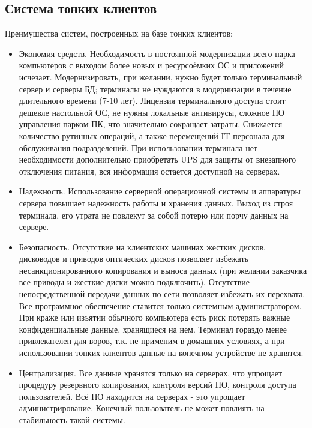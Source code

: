\subsection{Система тонких клиентов}

Преимушества систем, построенных на базе тонких клиентов:
\begin{itemize}
    \item   Экономия средств. Необходимость в постоянной модернизации всего парка
        компьютеров с выходом более новых и ресурсоёмких ОС и приложений исчезает.
        Модернизировать, при желании, нужно будет только терминальный сервер и серверы
        БД; терминалы не нуждаются в модернизации в течение длительного времени (7-10
        лет). Лицензия терминального доступа стоит дешевле настольной ОС, не нужны
        локальные антивирусы, сложное ПО управления парком ПК, что значительно сокращает
        затраты. Снижается количество рутинных операций, а также перемещений IT
        персонала для обслуживания подразделений. При использовании терминала нет
        необходимости дополнительно приобретать UPS для защиты от внезапного отключения
        питания, вся информация остается доступной на серверах.
    \item   Надежность. Использование серверной операционной системы и аппаратуры
        сервера повышает надежность работы и хранения данных. Выход из строя терминала,
        его утрата не повлекут за собой потерю или порчу данных на сервере.
    \item   Безопасность. Отсутствие на клиентских машинах жестких дисков, дисководов и
        приводов оптических дисков позволяет избежать несанкционированного копирования и
        выноса данных (при желании заказчика все приводы и жесткие диски можно
        подключить). Отсутствие непосредственной передачи данных по сети позволяет
        избежать их перехвата. Все программное обеспечение ставится только системным
        администратором. При краже или изъятии обычного компьютера есть риск потерять
        важные конфиденциальные данные, хранящиеся на нем. Терминал гораздо менее
        привлекателен для воров, т.к. не применим в домашних условиях, а при
        использовании тонких клиентов данные на конечном устройстве не хранятся.
    \item   Централизация. Все данные хранятся только на серверах, что упрощает
        процедуру резервного копирования, контроля версий ПО, контроля доступа
        пользователей. Всё ПО находится на серверах - это упрощает администрирование.
        Конечный пользователь не может повлиять на стабильность такой системы.

\end{itemize}
